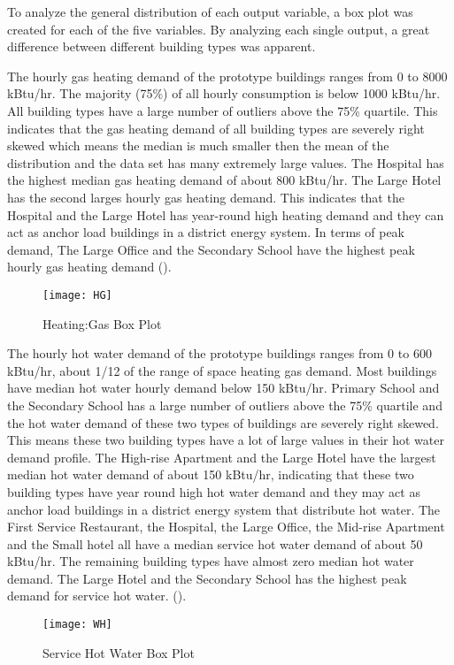 To analyze the general distribution of each output variable, a box
plot was created for each of the five variables. By analyzing each
single output, a great difference between different
building types was apparent.

The hourly gas heating demand of the prototype buildings ranges from 0
to 8000 kBtu/hr. The majority (75\%) of all hourly consumption is
below 1000 kBtu/hr. All building types have a large number of outliers
above the 75\% quartile. This indicates that the gas heating demand of
all building types are severely right skewed which means the median is
much smaller then the mean of the distribution and the data set has
many extremely large values. The Hospital has the highest median gas
heating demand of about 800 kBtu/hr. The Large Hotel has the second
larges hourly gas heating demand. This indicates that the Hospital and
the Large Hotel has year-round high heating demand and they can act as
anchor load buildings in a district energy system. In terms of peak
demand, The Large Office and the Secondary School have the highest
peak hourly gas heating demand ().
\begin{figure}[h!]
  \centering
  \texttt{[image: HG]}
  \caption[Heating:Gas Box Plot]{Heating:Gas Box Plot}
  \label{fig:HG}
\end{figure}%

The hourly hot water demand of the prototype buildings ranges from 0
to 600 kBtu/hr, about 1/12 of the range of space heating gas
demand. Most buildings have median hot water hourly demand below 150
kBtu/hr. Primary School and the Secondary School has a large number of
outliers above the 75\% quartile and the hot water demand of these two
types of buildings are severely right skewed. This means these two
building types have a lot of large values in their hot water demand
profile. The High-rise Apartment and the Large Hotel have the largest
median hot water demand of about 150 kBtu/hr, indicating that these
two building types have year round high hot water demand and they may
act as anchor load buildings in a district energy system that
distribute hot water. The First Service Restaurant, the Hospital, the
Large Office, the Mid-rise Apartment and the Small hotel all have a
median service hot water demand of about 50 kBtu/hr. The remaining
building types have almost zero median hot water demand. The Large
Hotel and the Secondary School has the highest peak demand for service
hot water. ().
\begin{figure}[h!]
  \centering
  \texttt{[image: WH]}
  \caption[Service Hot Water Box Plot]{Service Hot Water Box Plot}
  \label{fig:WH}
\end{figure}%

